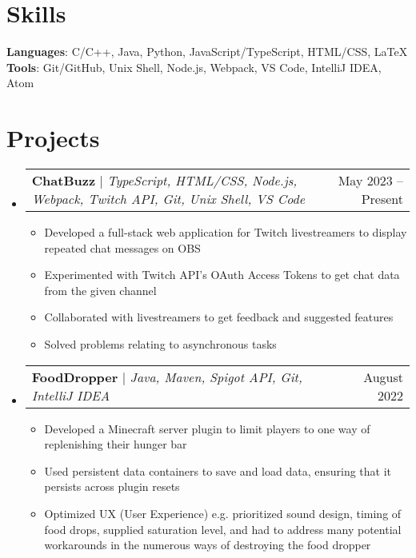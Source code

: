\documentclass[letterpaper,11pt]{article}
\makeatletter
\newcommand{\resumeItem}[1]{
  \item\small{
    {#1 \vspace{-2pt}}
  }
}
\newcommand{\resumeProjectHeading}[2]{
    \item
    \begin{tabular*}{0.97\textwidth}{l@{\extracolsep{\fill}}r}
      \small#1 & #2 \\
    \end{tabular*}\vspace{-7pt}
}
\newcommand{\resumeSubHeadingListStart}{\begin{itemize}[leftmargin=0.15in, label={}]}
\newcommand{\resumeSubHeadingListEnd}{\end{itemize}}
\newcommand{\resumeItemListStart}{\begin{itemize}}
\newcommand{\resumeItemListEnd}{\end{itemize}\vspace{-5pt}}
\makeatother
\begin{document}
\section{Skills}
\begin{itemize}[leftmargin=0.15in, label={}]
    \small{\item{

                    \textbf{Languages}{: C/C++, Java, Python, JavaScript/TypeScript, HTML/CSS, \LaTeX} \\

                    \textbf{Tools}{: Git/GitHub, Unix Shell, Node.js, Webpack, VS Code, IntelliJ IDEA, Atom}



              }}
\end{itemize}

\section{Projects}
\resumeSubHeadingListStart

\resumeProjectHeading
{\textbf{ChatBuzz} $|$ \footnotesize\emph{TypeScript, HTML/CSS, Node.js, Webpack, Twitch API, Git, Unix Shell, VS Code}}{May 2023 -- Present}
\resumeItemListStart
\resumeItem{Developed a full-stack web application for Twitch livestreamers to display repeated chat messages on OBS}
\resumeItem{Experimented with Twitch API's OAuth Access Tokens to get chat data from the given channel}
\resumeItem{Collaborated with livestreamers to get feedback and suggested features}
\resumeItem{Solved problems relating to asynchronous tasks}
\resumeItemListEnd

\resumeProjectHeading
{\textbf{FoodDropper} $|$ \footnotesize\emph{Java, Maven, Spigot API, Git, IntelliJ IDEA}}{August 2022}
\resumeItemListStart
\resumeItem{Developed a Minecraft server plugin to limit players to one way of replenishing their hunger bar}
\resumeItem{Used persistent data containers to save and load data, ensuring that it persists across plugin resets}
\resumeItem{Optimized UX (User Experience) e.g. prioritized sound design, timing of food drops, supplied saturation level, and had to address many potential workarounds in the numerous ways of destroying the food dropper}
\resumeItemListEnd

\resumeSubHeadingListEnd
\end{document}
